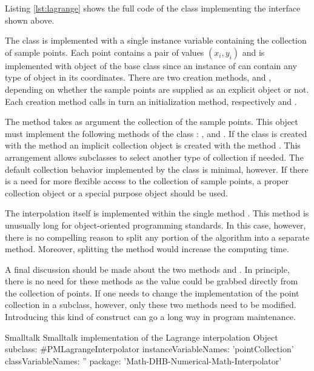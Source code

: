Listing \ref{lst:lagrange} shows the full code of the class
implementing the interface shown above.

The class  is implemented with a
single instance variable containing the collection of sample
points. Each point contains a pair of values
$\left(x_i,y_i\right)$ and is implemented with object of the base
class  since an instance of  can contain any
type of object in its coordinates. There are two creation methods,
 and , depending on whether the sample
points are supplied as an explicit object or not. Each creation
method calls in turn an initialization method, respectively  and .

The method  takes as argument the collection of the
sample points. This object must implement the following methods of
the class : ,  and .
If the class is created with the method  an implicit
collection object is created with the method . This arrangement allows subclasses to select
another type of collection if needed. The default collection
behavior implemented by the class  is
minimal, however. If there is a need for more flexible access to
the collection of sample points, a proper collection object or a
special purpose object should be used.

The interpolation itself is implemented within the single method
. This method is unusually long for object-oriented
programming standards. In this case, however, there is no
compelling reason to split any portion of the algorithm into a
separate method.
Moreover, splitting the method would increase the
computing time.

A final discussion should be made about the two methods  and .
In principle, there is no need for these methods as the value could be grabbed directly from the collection of points.
If one needs to change the implementation of the point collection in a subclass, however, only these two methods need to be modified.
Introducing this kind of construct can go a long way in program maintenance.

\begin{listing}[label=lst:lagrange]{Smalltalk}
{Smalltalk implementation of the Lagrange interpolation}
Object subclass: #PMLagrangeInterpolator
   instanceVariableNames: 'pointCollection'
   classVariableNames: ''
   package: 'Math-DHB-Numerical-Math-Interpolator'
\end{listing}


